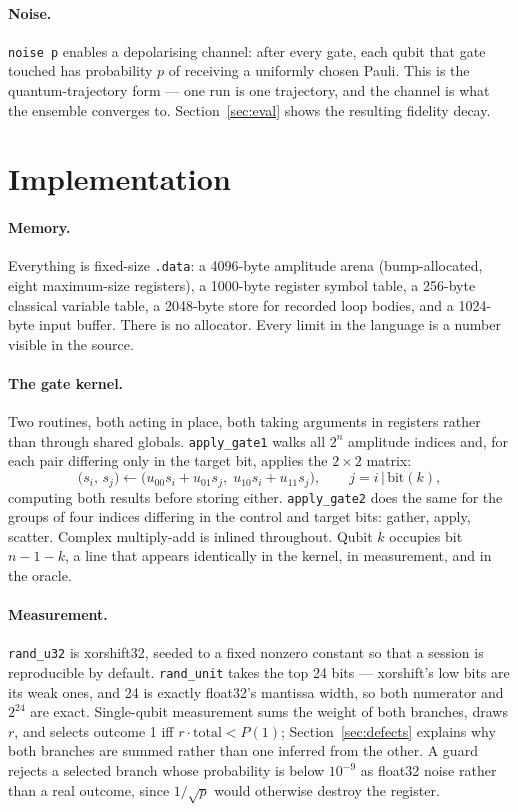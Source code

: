 \documentclass[11pt]{article}
\begin{document}
\paragraph{Noise.} \texttt{noise p} enables a depolarising channel: after every gate, each
qubit that gate touched has probability $p$ of receiving a uniformly chosen Pauli. This is
the quantum-trajectory form --- one run is one trajectory, and the channel is what the
ensemble converges to. Section~\ref{sec:eval} shows the resulting fidelity decay.

\section{Implementation}
\label{sec:impl}

\paragraph{Memory.} Everything is fixed-size \texttt{.data}: a 4096-byte amplitude arena
(bump-allocated, eight maximum-size registers), a 1000-byte register symbol table, a
256-byte classical variable table, a 2048-byte store for recorded loop bodies, and a
1024-byte input buffer. There is no allocator. Every limit in the language is a number
visible in the source.

\paragraph{The gate kernel.} Two routines, both acting in place, both taking arguments in
registers rather than through shared globals. \texttt{apply\_gate1} walks all $2^n$
amplitude indices and, for each pair differing only in the target bit, applies the $2\times2$
matrix:
\[
  \bigl(s_i,\, s_j\bigr) \leftarrow
  \bigl(u_{00} s_i + u_{01} s_j,\; u_{10} s_i + u_{11} s_j\bigr),
  \qquad j = i \,|\, \text{bit}(k),
\]
computing both results before storing either. \texttt{apply\_gate2} does the same for the
groups of four indices differing in the control and target bits: gather, apply, scatter.
Complex multiply-add is inlined throughout. Qubit $k$ occupies bit $n-1-k$, a line that
appears identically in the kernel, in measurement, and in the oracle.

\paragraph{Measurement.} \texttt{rand\_u32} is xorshift32, seeded to a fixed nonzero
constant so that a session is reproducible by default. \texttt{rand\_unit} takes the top 24
bits --- xorshift's low bits are its weak ones, and 24 is exactly float32's mantissa width,
so both numerator and $2^{24}$ are exact. Single-qubit measurement sums the weight of both
branches, draws $r$, and selects outcome 1 iff $r \cdot \text{total} < P(1)$;
Section~\ref{sec:defects} explains why both branches are summed rather than one inferred
from the other. A guard rejects a selected branch whose probability is below $10^{-9}$ as
float32 noise rather than a real outcome, since $1/\sqrt{p}$ would otherwise destroy the
register.
\end{document}

